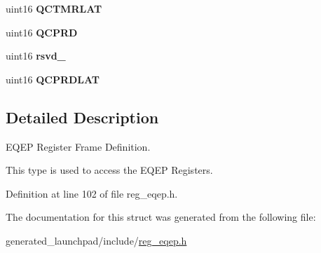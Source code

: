 \begin{DoxyCompactItemize}
uint16 {\bfseries Q\+C\+T\+M\+R\+L\+AT}
\item 
\mbox{\label{structeqepBASE_a649c495341e2b5cde8dea507b598bca8}} 
uint16 {\bfseries Q\+C\+P\+RD}
\item 
\mbox{\label{structeqepBASE_a2b2f184ca5f298dc62c0dcd2e3a1ba62}} 
uint16 {\bfseries rsvd\+\_}
\item 
\mbox{\label{structeqepBASE_ab0cb60eb1bd29e9f9e7e0b4c26d11890}} 
uint16 {\bfseries Q\+C\+P\+R\+D\+L\+AT}
\end{DoxyCompactItemize}


\subsection{Detailed Description}
E\+Q\+EP Register Frame Definition. 

This type is used to access the E\+Q\+EP Registers. 

Definition at line 102 of file reg\+\_\+eqep.\+h.



The documentation for this struct was generated from the following file\+:\begin{DoxyCompactItemize}
\item 
generated\+\_\+launchpad/include/\mbox{\hyperlink{reg__eqep_8h}{reg\+\_\+eqep.\+h}}\end{DoxyCompactItemize}
